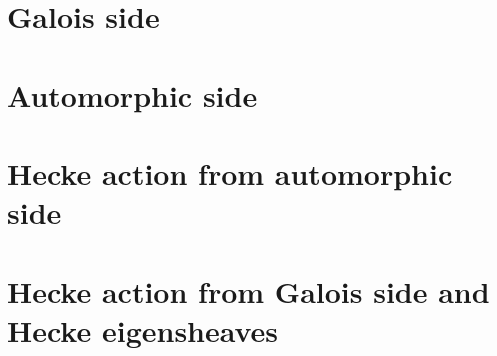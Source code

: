 \documentclass{article}
\begin{document}
\section{Galois side}


\section{Automorphic side}




\section{Hecke action from automorphic side}



\section{Hecke action from Galois side and Hecke eigensheaves}

\end{document}
